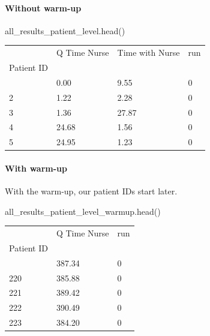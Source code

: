 \documentclass[
  letterpaper,
  DIV=11,
  numbers=noendperiod]{scrreprt}
\let\oldparagraph\paragraph
\renewcommand{\paragraph}[1]{\oldparagraph{#1}\mbox{}}
\newenvironment{Shaded}{\begin{snugshade}}{\end{snugshade}}
\newcommand{\NormalTok}[1]{\textcolor[rgb]{0.00,0.23,0.31}{#1}}
\begin{document}
\paragraph{Without warm-up}\label{without-warm-up}

\begin{Shaded}
\begin{Highlighting}[]
\NormalTok{all\_results\_patient\_level.head()}
\end{Highlighting}
\end{Shaded}

\label{results_p_level_head}
\begin{longtable}[]{@{}llll@{}}
\toprule\noalign{}
& Q Time Nurse & Time with Nurse & run \\
Patient ID & & & \\
\midrule\noalign{}
\endhead
\bottomrule\noalign{}
\endlastfoot
1 & 0.00 & 9.55 & 0 \\
2 & 1.22 & 2.28 & 0 \\
3 & 1.36 & 27.87 & 0 \\
4 & 24.68 & 1.56 & 0 \\
5 & 24.95 & 1.23 & 0 \\
\end{longtable}

\paragraph{With warm-up}\label{with-warm-up}

With the warm-up, our patient IDs start later.

\begin{Shaded}
\begin{Highlighting}[]
\NormalTok{all\_results\_patient\_level\_warmup.head()}
\end{Highlighting}
\end{Shaded}

\label{results_warmup_p_level_head}
\begin{longtable}[]{@{}lll@{}}
\toprule\noalign{}
& Q Time Nurse & run \\
Patient ID & & \\
\midrule\noalign{}
\endhead
\bottomrule\noalign{}
\endlastfoot
219 & 387.34 & 0 \\
220 & 385.88 & 0 \\
221 & 389.42 & 0 \\
222 & 390.49 & 0 \\
223 & 384.20 & 0 \\
\end{longtable}
\end{document}
